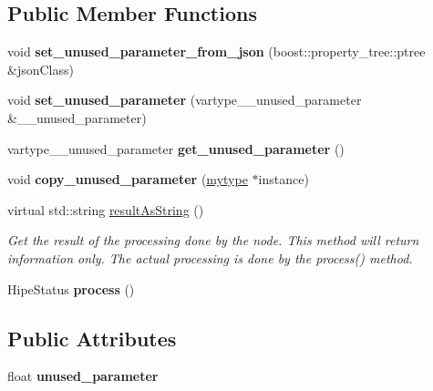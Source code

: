 \subsection*{Public Member Functions}
\begin{DoxyCompactItemize}
\item 
\mbox{\label{classfilter_1_1_algos_1_1_crop_ae36f5682bec6d851ddd0a65de6066ff3}} 
void {\bfseries set\+\_\+unused\+\_\+parameter\+\_\+from\+\_\+json} (boost\+::property\+\_\+tree\+::ptree \&json\+Class)
\item 
\mbox{\label{classfilter_1_1_algos_1_1_crop_abe8021a27f7a36822858d0ed3c83aeb8}} 
void {\bfseries set\+\_\+unused\+\_\+parameter} (vartype\+\_\+\+\_\+unused\+\_\+parameter \&\+\_\+\+\_\+unused\+\_\+parameter)
\item 
\mbox{\label{classfilter_1_1_algos_1_1_crop_ae4d3c8e6fc650f5dff23482ba40a2779}} 
vartype\+\_\+\+\_\+unused\+\_\+parameter {\bfseries get\+\_\+unused\+\_\+parameter} ()
\item 
\mbox{\label{classfilter_1_1_algos_1_1_crop_a81705a3d09c4ae88141dea27809d887f}} 
void {\bfseries copy\+\_\+unused\+\_\+parameter} (\hyperlink{classfilter_1_1_algos_1_1_crop}{mytype} $\ast$instance)
\item 
virtual std\+::string \hyperlink{classfilter_1_1_algos_1_1_crop_a44ded08379421eb046be865a884139e8}{result\+As\+String} ()
\begin{DoxyCompactList}\small\item\em Get the result of the processing done by the node. This method will return information only. The actual processing is done by the process() method. \end{DoxyCompactList}\item 
\mbox{\label{classfilter_1_1_algos_1_1_crop_ab7e40e16c3a8024dc8b40d1e21ae6bff}} 
Hipe\+Status {\bfseries process} ()
\end{DoxyCompactItemize}
\subsection*{Public Attributes}
\begin{DoxyCompactItemize}
\item 
\mbox{\label{classfilter_1_1_algos_1_1_crop_a77387f1cdaea7cc42f959595337e56d4}} 
float {\bfseries unused\+\_\+parameter}
\end{DoxyCompactItemize}
